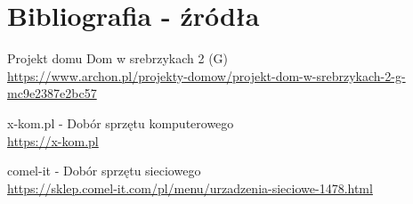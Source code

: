 
\section{Bibliografia - źródła }



\begin{thebibliography}{9}
    Projekt domu Dom w srebrzykach 2 (G) \\
    \url{https://www.archon.pl/projekty-domow/projekt-dom-w-srebrzykach-2-g-mc9e2387e2bc57}
    

    x-kom.pl - Dobór sprzętu komputerowego \\
    \url{https://x-kom.pl}
    
    comel-it - Dobór sprzętu sieciowego \\
    \url{https://sklep.comel-it.com/pl/menu/urzadzenia-sieciowe-1478.html}
    


\end{thebibliography}